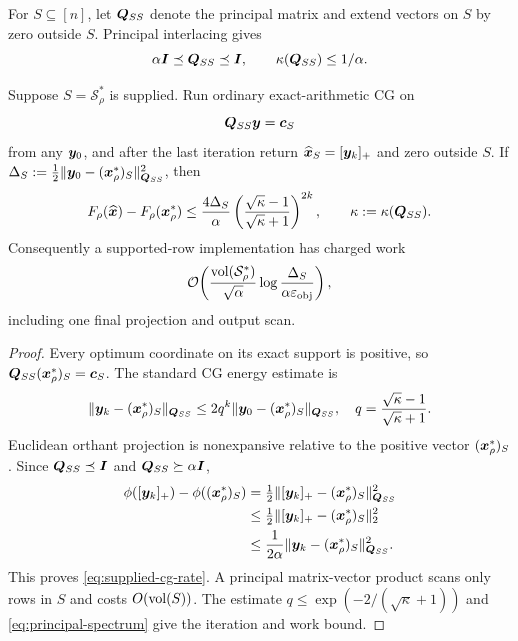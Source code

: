 For $S\subseteq[n]$, let $\bm{Q}_{SS}$ denote the principal matrix and extend
vectors on $S$ by zero outside $S$.  Principal interlacing gives
\begin{equation}
 \alpha\bm{I}\preceq\bm{Q}_{SS}\preceq\bm{I},
 \qquad
 \kappa(\bm{Q}_{SS})\leq1/\alpha.
 \label{eq:principal-spectrum}
\end{equation}

\begin{theorem}
\label{thm:supplied-cg}
Suppose $S=\mathcal S_\rho^*$ is supplied.  Run ordinary exact-arithmetic CG on
\begin{equation}
 \bm{Q}_{SS}\bm{y}=\bm{c}_S
 \label{eq:face-system}
\end{equation}
from any $\bm{y}_0$, and after the last iteration return
$\widehat{\bm{x}}_S=[\bm{y}_k]_+$ and zero outside $S$.  If
$\Delta_S:=\tfrac12\lVert\bm{y}_0-(\bm{x}_\rho^*)_S\rVert_{\bm{Q}_{SS}}^2$, then
\begin{equation}
 F_\rho(\widehat{\bm{x}})-F_\rho(\bm{x}_\rho^*)
 \leq \frac{4\Delta_S}{\alpha}
 \left(\frac{\sqrt\kappa-1}{\sqrt\kappa+1}\right)^{2k},
 \qquad \kappa:=\kappa(\bm{Q}_{SS}).
 \label{eq:supplied-cg-rate}
\end{equation}
Consequently a supported-row implementation has charged work
\begin{equation}
 \mathcal{O}\!\left(
   \frac{\operatorname{vol}(\mathcal S_\rho^*)}{\sqrt\alpha}
   \log\frac{\Delta_S}{\alpha\varepsilon_{\mathrm{obj}}}
 \right),
 \label{eq:supplied-work}
\end{equation}
including one final projection and output scan.
\end{theorem}

\begin{proof}
Every optimum coordinate on its exact support is positive, so
$\bm{Q}_{SS}(\bm{x}_\rho^*)_S=\bm{c}_S$.  The standard CG energy estimate
\citep{hestenes1952methods} is
\[
 \lVert\bm{y}_k-(\bm{x}_\rho^*)_S\rVert_{\bm{Q}_{SS}}
 \leq2q^k\lVert\bm{y}_0-(\bm{x}_\rho^*)_S\rVert_{\bm{Q}_{SS}},
 \quad q=\frac{\sqrt\kappa-1}{\sqrt\kappa+1}.
\]
Euclidean orthant projection is nonexpansive relative to the positive vector
$(\bm{x}_\rho^*)_S$.  Since $\bm{Q}_{SS}\preceq\bm{I}$ and
$\bm{Q}_{SS}\succeq\alpha\bm{I}$,
\begin{align*}
 \phi([\bm{y}_k]_+)-\phi((\bm{x}_\rho^*)_S)
 &=\tfrac12\lVert[\bm{y}_k]_+-(\bm{x}_\rho^*)_S\rVert_{\bm{Q}_{SS}}^2\\
 &\leq\tfrac12\lVert[\bm{y}_k]_+-(\bm{x}_\rho^*)_S\rVert_2^2\\
 &\leq\frac1{2\alpha}
       \lVert\bm{y}_k-(\bm{x}_\rho^*)_S\rVert_{\bm{Q}_{SS}}^2.
\end{align*}
This proves \cref{eq:supplied-cg-rate}.  A principal matrix-vector product
scans only rows in $S$ and costs $O(\operatorname{vol}(S))$.  The estimate
$q\leq\exp(-2/(\sqrt\kappa+1))$ and \cref{eq:principal-spectrum} give the
iteration and work bound.
\end{proof}

